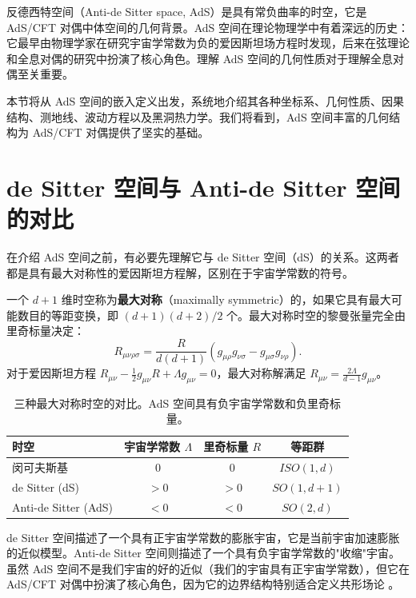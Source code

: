 
反德西特空间（Anti-de Sitter space, AdS）是具有常负曲率的时空，它是 AdS/CFT 对偶中体空间的几何背景。AdS 空间在理论物理学中有着深远的历史：它最早由物理学家在研究宇宙学常数为负的爱因斯坦场方程时发现，后来在弦理论和全息对偶的研究中扮演了核心角色。理解 AdS 空间的几何性质对于理解全息对偶至关重要。

本节将从 AdS 空间的嵌入定义出发，系统地介绍其各种坐标系、几何性质、因果结构、测地线、波动方程以及黑洞热力学。我们将看到，AdS 空间丰富的几何结构为 AdS/CFT 对偶提供了坚实的基础。

\section{de Sitter 空间与 Anti-de Sitter 空间的对比}

在介绍 AdS 空间之前，有必要先理解它与 de Sitter 空间（dS）的关系。这两者都是具有最大对称性的爱因斯坦方程解，区别在于宇宙学常数的符号。

\begin{definition}[最大对称时空]
一个 $d+1$ 维时空称为\textbf{最大对称}（maximally symmetric）的，如果它具有最大可能数目的等距变换，即 $(d+1)(d+2)/2$ 个。最大对称时空的黎曼张量完全由里奇标量决定：
\begin{equation}
    R_{\mu\nu\rho\sigma} = \frac{R}{d(d+1)} \left( g_{\mu\rho} g_{\nu\sigma} - g_{\mu\sigma} g_{\nu\rho} \right).
\end{equation}
对于爱因斯坦方程 $R_{\mu\nu} - \frac{1}{2} g_{\mu\nu} R + \Lambda g_{\mu\nu} = 0$，最大对称解满足 $R_{\mu\nu} = \frac{2\Lambda}{d-1} g_{\mu\nu}$。
\end{definition}

\begin{table}[htbp]
\centering
\begin{tabular}{|l|c|c|c|}
\hline
\textbf{时空} & \textbf{宇宙学常数 $\Lambda$} & \textbf{里奇标量 $R$} & \textbf{等距群} \\
\hline
闵可夫斯基 & $0$ & $0$ & $ISO(1,d)$ \\
de Sitter (dS) & $> 0$ & $> 0$ & $SO(1,d+1)$ \\
Anti-de Sitter (AdS) & $< 0$ & $< 0$ & $SO(2,d)$ \\
\hline
\end{tabular}
\caption{三种最大对称时空的对比。AdS 空间具有负宇宙学常数和负里奇标量。}
\label{tab:maximally_symmetric}
\end{table}

de Sitter 空间描述了一个具有正宇宙学常数的膨胀宇宙，它是当前宇宙加速膨胀的近似模型。Anti-de Sitter 空间则描述了一个具有负宇宙学常数的"收缩"宇宙。虽然 AdS 空间不是我们宇宙的好的近似（我们的宇宙具有正宇宙学常数），但它在 AdS/CFT 对偶中扮演了核心角色，因为它的边界结构特别适合定义共形场论 \cite{Maldacena1997}。

